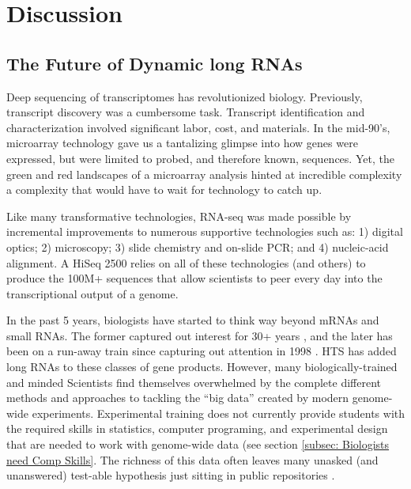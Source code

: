 \chapter{Discussion} \label{Chapter 5} 

\section{The Future of Dynamic long RNAs}

  Deep sequencing of transcriptomes has revolutionized biology. Previously, transcript discovery was a cumbersome task. Transcript identification and characterization involved significant labor, cost, and materials. In the mid-90's, microarray technology \citep{Schena1995a} gave us a tantalizing glimpse into how genes were expressed, but were limited to probed, and therefore known, sequences. Yet, the green and red landscapes of a microarray analysis hinted at incredible complexity \textemdash a complexity that would have to wait for technology to catch up.

  Like many transformative technologies, RNA-seq was made possible by incremental improvements to numerous supportive technologies such as: 1) digital optics; 2) microscopy; 3) slide chemistry and on-slide PCR; and 4) nucleic-acid alignment. A HiSeq 2500 relies on all of these technologies (and others) to produce the 100M+ sequences that allow scientists to peer every day into the transcriptional output of a genome.

  In the past 5 years, biologists have started to think way beyond mRNAs and small RNAs. The former captured out interest for 30+ years \citep{Furuichi1975,Wei1975}, and the later has been on a run-away train since capturing out attention in 1998 \citep{Fire1998}. HTS has added long RNAs to these classes of gene products. However, many biologically-trained and minded Scientists find themselves overwhelmed by the complete different methods and approaches to tackling the ``big data'' created by modern genome-wide experiments. Experimental training does not currently provide students with the required skills in statistics, computer programing, and experimental design that are needed to work with genome-wide data (see section \ref{subsec: Biologists need Comp Skills}. The richness of this data often leaves many unasked (and unanswered) test-able hypothesis just sitting in public repositories \citep{Plocik2013}.

